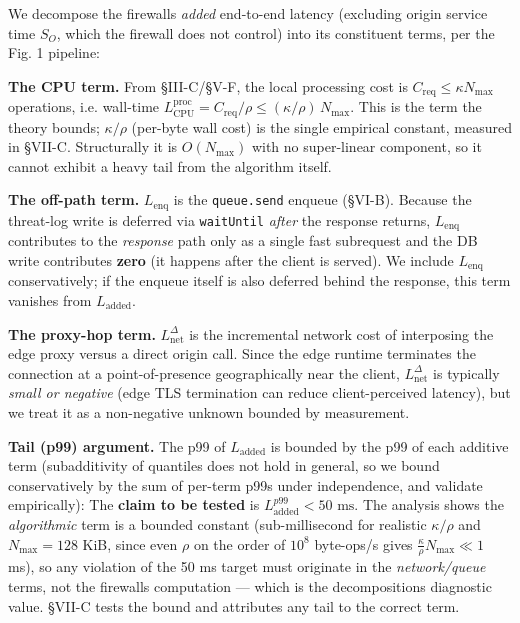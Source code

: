We decompose the firewall\textquotesingle s \emph{added} end-to-end
latency (excluding origin service time \(S_O\), which the firewall does
not control) into its constituent terms, per the Fig. 1 pipeline:

\textbf{The CPU term.} From §III-C/§V-F, the local processing cost is
\(C_{\text{req}}\le\kappa N_{\max}\) operations, i.e. wall-time
\(L_{\text{CPU}}^{\text{proc}} = C_{\text{req}}/\rho \le
(\kappa/\rho)\,N_{\max}\). This is the term the theory bounds;
\(\kappa/\rho\) (per-byte wall cost) is the single empirical constant,
measured in §VII-C. Structurally it is \(O(N_{\max})\) with no
super-linear component, so it cannot exhibit a heavy tail from the
algorithm itself.

\textbf{The off-path term.} \(L_{\text{enq}}\) is the
\passthrough{\lstinline!queue.send!} enqueue (§VI-B). Because the
threat-log write is deferred via \passthrough{\lstinline!waitUntil!}
\emph{after} the response returns, \(L_{\text{enq}}\) contributes to the
\emph{response} path only as a single fast subrequest and the DB write
contributes \textbf{zero} (it happens after the client is served). We
include \(L_{\text{enq}}\) conservatively; if the enqueue itself is also
deferred behind the response, this term vanishes from
\(L_{\text{added}}\).

\textbf{The proxy-hop term.} \(L_{\text{net}}^{\Delta}\) is the
incremental network cost of interposing the edge proxy versus a direct
origin call. Since the edge runtime terminates the connection at a
point-of-presence geographically near the client,
\(L_{\text{net}}^{\Delta}\) is typically \emph{small or negative} (edge
TLS termination can reduce client-perceived latency), but we treat it as
a non-negative unknown bounded by measurement.

\textbf{Tail (p99) argument.} The p99 of \(L_{\text{added}}\) is bounded
by the p99 of each additive term (subadditivity of quantiles does not
hold in general, so we bound conservatively by the sum of per-term p99s
under independence, and validate empirically):
 The
\textbf{claim to be tested} is
\(L_{\text{added}}^{p99} < 50\text{ ms}\). The analysis shows the
\emph{algorithmic} term is a bounded constant (sub-millisecond for
realistic \(\kappa/\rho\) and \(N_{\max}=128\) KiB, since even \(\rho\)
on the order of \(10^{8}\) byte-ops/s gives
\(\frac{\kappa}{\rho}N_{\max}\ll 1\) ms), so any violation of the 50 ms
target must originate in the \emph{network/queue} terms, not the
firewall\textquotesingle s computation --- which is the
decomposition\textquotesingle s diagnostic value. §VII-C tests the bound
and attributes any tail to the correct term.

